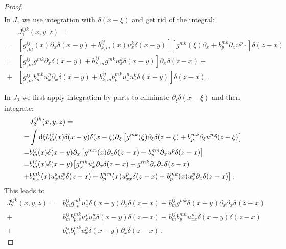 \begin{proof}
\begin{align}
    \end{align}
    In $J_1$ we use integration with $\delta(x-\xi)$ and get rid of the integral:
    \begin{align}
        &J_1^{ijk}(x,y,z) = \nonumber
        \\=& \left[ g^{ij}_{,m}(x) \partial_x \delta(x-y) + b^{ij}_{k,m}(x) u^k_x \delta(x-y) \right] 
        \left[ g^{mk}(\xi) \partial_x + b^{mk}_p \partial_x u^p \cdot \right] \delta(z-x) \nonumber
        \\
        =& \left[ g^{ij}_{,m} g^{mk} \partial_x \delta(x-y) + b^{ij}_{k,m} g^{mk} u^k_x \delta(x-y) \right] \partial_x \delta(z-x) + \nonumber
        \\ 
        +& \left[ g^{ij}_{,m} b^{mk}_p u^p_x \partial_x \delta(x-y) + b^{ij}_{k,m} b^{mk}_p u_x^p  u_x^k \delta(x-y) \right] \delta(z-x) \:.
    \end{align}

    In $J_2$ we first apply integration by parts to eliminate $\partial_\xi \delta(x-\xi)$ and then integrate:
    \begin{align}
        &J_2^{ijk}(x,y,z) = \nonumber
        \\=& \int \mathrm{d} \xi b^{ij}_m(x) \delta(x-y) \delta(x-\xi) \partial_\xi \left[ g^{mk}(\xi) \partial_\xi \delta(z-\xi) + b^{mk}_p \partial_\xi u^p \delta(z-\xi) \right] \nonumber
        \\ =& b^{ij}_m(x) \delta(x-y) \partial_x \left[ g^{mn}(x) \partial_x \delta(z-x) + b^{mn}_p \partial_x u^p \delta(z-x) \right] \nonumber
        \\ =& b^{ij}_m(x) \delta(x-y) \big[ g^{mk}_{,s} u^s_x \partial_x \delta (z-x) + g^{mk} \partial_x \partial_x \delta (z-x) \nonumber
        \\ +& b^{mk}_{p,s}(x) u^s_x u^p_x \delta (z-x) + b^{mn}_{p}(x) u^p_{xx} \delta (z-x) + b^{mk}_{p}(x) u^p_x \partial_x \delta (z-x) \big] \:,
    \end{align}
    This leads to
    \begin{align}
        J_2^{ijk}(x,y,z) =& b^{ij}_m g^{mk}_{,s} u^s_x \delta (x-y) \partial_x \delta (z-x) 
        + b^{ij}_m g^{mk} \delta(x-y) \partial_x \partial_x \delta (z-x) \nonumber
        \\ +& b^{ij}_m b^{mk}_{p,s} u^s_x u^p_x \delta (x-y) \delta (z-x)
        + b^{ij}_m b^{mn}_p u^p_{xx} \delta (x-y) \delta(z-x) \nonumber 
        \\ +& b^{ij}_m b^{mk}_p u^p_x \delta(x-y) \partial_x \delta(z-x) \:.
    \end{align}


\end{proof}
